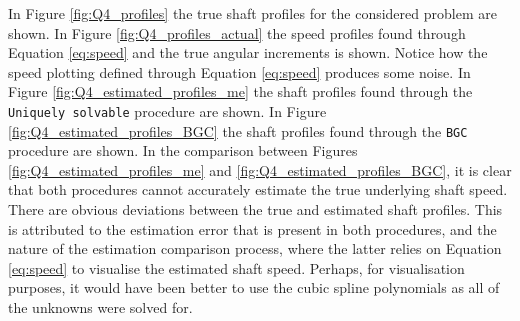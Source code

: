 \documentclass{article}
\begin{document}
	In Figure \ref{fig:Q4_profiles} the true shaft profiles for the considered problem are shown. In Figure \ref{fig:Q4_profiles_actual} the speed profiles found through Equation \eqref{eq:speed} and the true angular increments is shown. Notice how the speed plotting defined through Equation \eqref{eq:speed} produces some noise. In Figure \ref{fig:Q4_estimated_profiles_me} the shaft profiles found through the \texttt{Uniquely solvable} procedure are shown. In Figure \ref{fig:Q4_estimated_profiles_BGC} the shaft profiles found through the \texttt{BGC} procedure are shown. In the comparison between Figures \ref{fig:Q4_estimated_profiles_me} and \ref{fig:Q4_estimated_profiles_BGC}, it is clear that both procedures cannot accurately estimate the true underlying shaft speed. There are obvious deviations between the true and estimated shaft profiles. This is attributed to the estimation error that is present in both procedures, and the nature of the estimation comparison process, where the latter relies on Equation \eqref{eq:speed} to visualise the estimated shaft speed. Perhaps, for visualisation purposes, it would have been better to use the cubic spline polynomials as all of the unknowns were solved for.
\end{document}

